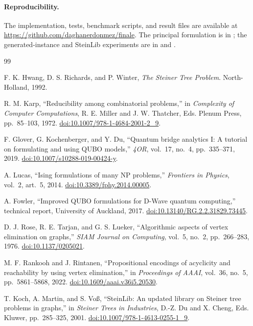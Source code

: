 \documentclass[10pt,a4paper]{article}
\begin{document}
\paragraph{Reproducibility.}
The implementation, tests, benchmark scripts, and result files are available
at \url{https://github.com/daghanerdonmez/finale}. The principal formulation is
in ; the generated-instance and
SteinLib experiments are in  and
.

\begin{thebibliography}{99}

F. K. Hwang, D. S. Richards, and P. Winter,
\emph{The Steiner Tree Problem}. North-Holland, 1992.

R. M. Karp,
``Reducibility among combinatorial problems,'' in
\emph{Complexity of Computer Computations}, R. E. Miller and
J. W. Thatcher, Eds. Plenum Press, pp.~85--103, 1972.
\href{https://doi.org/10.1007/978-1-4684-2001-2_9}{doi:10.1007/978-1-4684-2001-2\_9}.

F. Glover, G. Kochenberger, and Y. Du,
``Quantum bridge analytics I: A tutorial on formulating and using QUBO
models,'' \emph{4OR}, vol.~17, no.~4, pp.~335--371, 2019.
\href{https://doi.org/10.1007/s10288-019-00424-y}{doi:10.1007/s10288-019-00424-y}.

A. Lucas,
``Ising formulations of many NP problems,''
\emph{Frontiers in Physics}, vol.~2, art.~5, 2014.
\href{https://doi.org/10.3389/fphy.2014.00005}{doi:10.3389/fphy.2014.00005}.

A. Fowler,
``Improved QUBO formulations for D-Wave quantum computing,''
technical report, University of Auckland, 2017.
\href{https://doi.org/10.13140/RG.2.2.31829.73445}{doi:10.13140/RG.2.2.31829.73445}.

D. J. Rose, R. E. Tarjan, and G. S. Lueker,
``Algorithmic aspects of vertex elimination on graphs,''
\emph{SIAM Journal on Computing}, vol.~5, no.~2, pp.~266--283, 1976.
\href{https://doi.org/10.1137/0205021}{doi:10.1137/0205021}.

M. F. Rankooh and J. Rintanen,
``Propositional encodings of acyclicity and reachability by using vertex
elimination,'' in \emph{Proceedings of AAAI}, vol.~36, no.~5,
pp.~5861--5868, 2022.
\href{https://doi.org/10.1609/aaai.v36i5.20530}{doi:10.1609/aaai.v36i5.20530}.

T. Koch, A. Martin, and S. Vo\ss,
``SteinLib: An updated library on Steiner tree problems in graphs,''
in \emph{Steiner Trees in Industries}, D.-Z. Du and X. Cheng, Eds.
Kluwer, pp.~285--325, 2001.
\href{https://doi.org/10.1007/978-1-4613-0255-1_9}{doi:10.1007/978-1-4613-0255-1\_9}.

\end{thebibliography}
\end{document}
